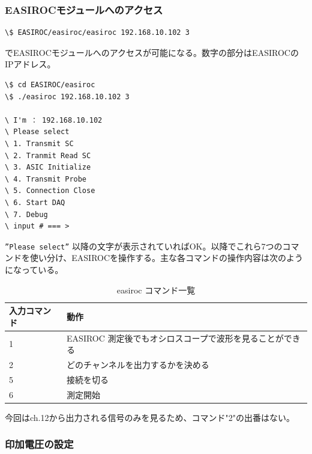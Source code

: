 \subsubsection{EASIROCモジュールへのアクセス}

\begin{lstlisting}[caption=EASIROCモジュールへのアクセス]
  \$ EASIROC/easiroc/easiroc 192.168.10.102 3
\end{lstlisting}
でEASIROCモジュールへのアクセスが可能になる。数字の部分はEASIROCのIPアドレス。

\begin{lstlisting}
\$ cd EASIROC/easiroc
\$ ./easiroc 192.168.10.102 3

\ I'm ： 192.168.10.102
\ Please select
\ 1. Transmit SC
\ 2. Tranmit Read SC
\ 3. ASIC Initialize
\ 4. Transmit Probe
\ 5. Connection Close
\ 6. Start DAQ
\ 7. Debug
\ input # === >
\end{lstlisting}
{\tt ”Please select''} 以降の文字が表示されていればOK。以降でこれら7つのコマンドを使い分け、EASIROCを操作する。主な各コマンドの操作内容は次のようになっている。

\begin{table}[htbp]
  \begin{center}
    \caption{easiroc コマンド一覧}
    \begin{tabular}{|l|l|} \hline
      入力コマンド & 動作                                                     \\ \hline \hline
      1            & EASIROC 測定後でもオシロスコープで波形を見ることができる \\ \hline
      2            & どのチャンネルを出力するかを決める                       \\ \hline
      5            & 接続を切る                                               \\ \hline
      6            & 測定開始                                                 \\ \hline
    \end{tabular}
  \end{center}
\end{table}

今回はch.12から出力される信号のみを見るため、コマンド"2"の出番はない。

\subsubsection{印加電圧の設定}

